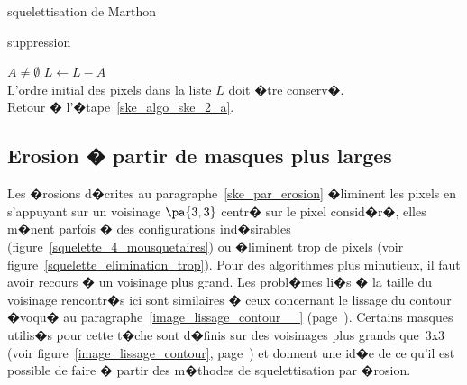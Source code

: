 \begin{xalgorithm}{squelettisation de Marthon}
        \begin{xalgostep}{suppression}
                \begin{xif}{$A \neq \emptyset$}
                    $L \longleftarrow L - A$ \\
                    L'ordre initial des pixels dans la liste $L$ doit �tre conserv�. \\
                    Retour � l'�tape~\ref{ske_algo_ske_2_a}.
                \end{xif}        
        \end{xalgostep}
        
        
        \end{xalgorithm}
        















\subsection{Erosion � partir de masques plus larges}


Les �rosions d�crites au paragraphe~\ref{ske_par_erosion} �liminent les pixels en s'appuyant sur un voisinage $\pa{3,3}$ centr� sur le pixel consid�r�, elles m�nent parfois � des configurations ind�sirables (figure~\ref{squelette_4_mousquetaires}) ou �liminent trop de pixels (voir figure~\ref{squelette_elimination_trop}). Pour des algorithmes plus minutieux, il faut avoir recours � un voisinage plus grand. Les probl�mes li�s � la taille du voisinage rencontr�s ici sont similaires � ceux concernant le lissage du contour �voqu� au paragraphe~\ref{image_lissage_contour__} (page~\pageref{image_lissage_contour__}). Certains masques utilis�s pour cette t�che sont d�finis sur des voisinages plus grands que~3x3 (voir figure~\ref{image_lissage_contour}, page~\pageref{image_lissage_contour}) et donnent une id�e de ce qu'il est possible de faire � partir des m�thodes de squelettisation par �rosion.



